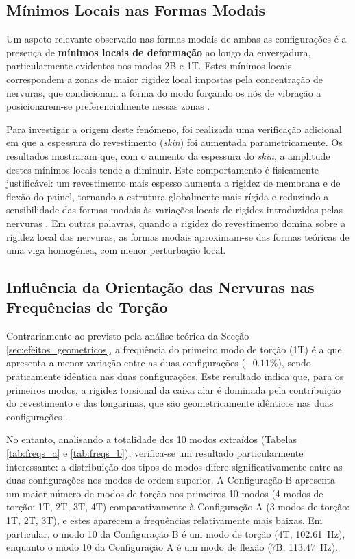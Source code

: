 \documentclass[11pt,oneside,a4paper,final]{report}
\begin{document}
\subsection{Mínimos Locais nas Formas Modais}

Um aspeto relevante observado nas formas modais de ambas as configurações é a presença de \textbf{mínimos locais de deformação} ao longo da envergadura, particularmente evidentes nos modos 2B e 1T. Estes mínimos locais correspondem a zonas de maior rigidez local impostas pela concentração de nervuras, que condicionam a forma do modo forçando os nós de vibração a posicionarem-se preferencialmente nessas zonas \cite{Rao2011, Bathe2014}.

Para investigar a origem deste fenómeno, foi realizada uma verificação adicional em que a espessura do revestimento (\textit{skin}) foi aumentada parametricamente. Os resultados mostraram que, com o aumento da espessura do \textit{skin}, a amplitude destes mínimos locais tende a diminuir. Este comportamento é fisicamente justificável: um revestimento mais espesso aumenta a rigidez de membrana e de flexão do painel, tornando a estrutura globalmente mais rígida e reduzindo a sensibilidade das formas modais às variações locais de rigidez introduzidas pelas nervuras \cite{Megson2012, Cook2001}. Em outras palavras, quando a rigidez do revestimento domina sobre a rigidez local das nervuras, as formas modais aproximam-se das formas teóricas de uma viga homogénea, com menor perturbação local.

\subsection{Influência da Orientação das Nervuras nas Frequências de Torção}

Contrariamente ao previsto pela análise teórica da Secção \ref{sec:efeitos_geometricos}, a frequência do primeiro modo de torção (1T) é a que apresenta a menor variação entre as duas configurações ($-0.11\%$), sendo praticamente idêntica nas duas configurações. Este resultado indica que, para os primeiros modos, a rigidez torsional da caixa alar é dominada pela contribuição do revestimento e das longarinas, que são geometricamente idênticos nas duas configurações \cite{Megson2012, Niu1988}.

No entanto, analisando a totalidade dos 10 modos extraídos (Tabelas \ref{tab:freqs_a} e \ref{tab:freqs_b}), verifica-se um resultado particularmente interessante: a distribuição dos tipos de modos difere significativamente entre as duas configurações nos modos de ordem superior. A Configuração B apresenta um maior número de modos de torção nos primeiros 10 modos (4 modos de torção: 1T, 2T, 3T, 4T) comparativamente à Configuração A (3 modos de torção: 1T, 2T, 3T), e estes aparecem a frequências relativamente mais baixas. Em particular, o modo 10 da Configuração B é um modo de torção (4T, \SI{102.61}{\hertz}), enquanto o modo 10 da Configuração A é um modo de flexão (7B, \SI{113.47}{\hertz}).
\end{document}
